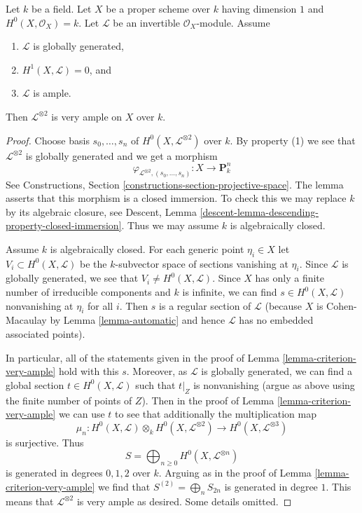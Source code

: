 \begin{lemma}
\label{lemma-criterion-very-ample-bis}
Let $k$ be a field. Let $X$ be a proper scheme over $k$ having dimension $1$
and $H^0(X, \mathcal{O}_X) = k$. Let $\mathcal{L}$ be an invertible
$\mathcal{O}_X$-module. Assume
\begin{enumerate}
\item $\mathcal{L}$ is globally generated,
\item $H^1(X, \mathcal{L}) = 0$, and
\item $\mathcal{L}$ is ample.
\end{enumerate}
Then $\mathcal{L}^{\otimes 2}$ is very ample on $X$ over $k$.
\end{lemma}

\begin{proof}
Choose basis $s_0, \ldots, s_n$ of $H^0(X, \mathcal{L}^{\otimes 2})$
over $k$. By property (1) we see that $\mathcal{L}^{\otimes 2}$
is globally generated and we get a morphism
$$
\varphi_{\mathcal{L}^{\otimes 2}, (s_0, \ldots, s_n)} :
X \longrightarrow \mathbf{P}^n_k
$$
See Constructions, Section \ref{constructions-section-projective-space}.
The lemma asserts that this morphism is a closed immersion.
To check this we may replace $k$ by its algebraic closure, see
Descent, Lemma \ref{descent-lemma-descending-property-closed-immersion}.
Thus we may assume $k$ is algebraically closed.

\medskip\noindent
Assume $k$ is algebraically closed. For each generic point $\eta_i \in X$
let $V_i \subset H^0(X, \mathcal{L})$ be the $k$-subvector space of
sections vanishing at $\eta_i$. Since $\mathcal{L}$ is globally generated,
we see that $V_i \not = H^0(X, \mathcal{L})$. Since $X$ has only a
finite number of irreducible components and $k$ is infinite, we can find
$s \in H^0(X, \mathcal{L})$ nonvanishing at $\eta_i$ for all $i$.
Then $s$ is a regular section of $\mathcal{L}$ (because $X$ is
Cohen-Macaulay by Lemma \ref{lemma-automatic} and hence $\mathcal{L}$
has no embedded associated points).

\medskip\noindent
In particular, all of the statements given in the proof of
Lemma \ref{lemma-criterion-very-ample} hold with this $s$.
Moreover, as $\mathcal{L}$ is globally generated, we can find
a global section $t \in H^0(X, \mathcal{L})$ such that
$t|_Z$ is nonvanishing (argue as above using the finite number
of points of $Z$). Then in the proof of Lemma \ref{lemma-criterion-very-ample}
we can use $t$ to see that additionally the multiplication map
$$
\mu_n :
H^0(X, \mathcal{L}) \otimes_k H^0(X, \mathcal{L}^{\otimes 2})
\longrightarrow
H^0(X, \mathcal{L}^{\otimes 3})
$$
is surjective. Thus
$$
S = \bigoplus\nolimits_{n \geq 0} H^0(X, \mathcal{L}^{\otimes n})
$$
is generated in degrees $0, 1, 2$ over $k$. Arguing as in the
proof of Lemma \ref{lemma-criterion-very-ample} we find that
$S^{(2)} = \bigoplus_{n} S_{2n}$ is generated in degree $1$.
This means that $\mathcal{L}^{\otimes 2}$ is very ample as desired.
Some details omitted.
\end{proof}










